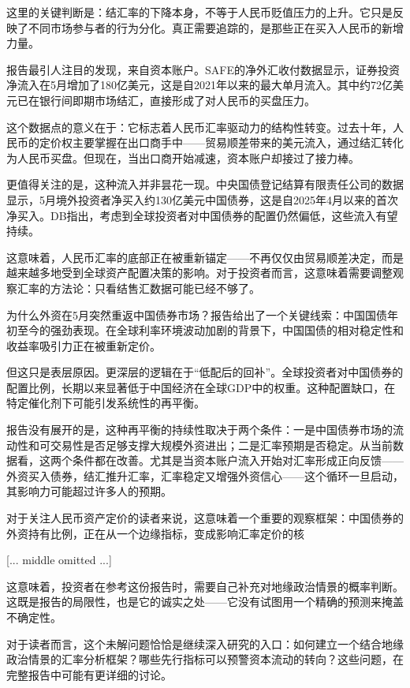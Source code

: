 \documentclass[11pt]{ctexart}
\begin{document}
这里的关键判断是：结汇率的下降本身，不等于人民币贬值压力的上升。它只是反映了不同市场参与者的行为分化。真正需要追踪的，是那些正在买入人民币的新增力量。

报告最引人注目的发现，来自资本账户。SAFE的净外汇收付数据显示，证券投资净流入在5月增加了180亿美元，这是自2021年以来的最大单月流入。其中约72亿美元已在银行间即期市场结汇，直接形成了对人民币的买盘压力。

这个数据点的意义在于：它标志着人民币汇率驱动力的结构性转变。过去十年，人民币的定价权主要掌握在出口商手中——贸易顺差带来的美元流入，通过结汇转化为人民币买盘。但现在，当出口商开始减速，资本账户却接过了接力棒。

更值得关注的是，这种流入并非昙花一现。中央国债登记结算有限责任公司的数据显示，5月境外投资者净买入约130亿美元中国债券，这是自2025年4月以来的首次净买入。DB指出，考虑到全球投资者对中国债券的配置仍然偏低，这些流入有望持续。

这意味着，人民币汇率的底部正在被重新锚定——不再仅仅由贸易顺差决定，而是越来越多地受到全球资产配置决策的影响。对于投资者而言，这意味着需要调整观察汇率的方法论：只看结售汇数据可能已经不够了。

为什么外资在5月突然重返中国债券市场？报告给出了一个关键线索：中国国债年初至今的强劲表现。在全球利率环境波动加剧的背景下，中国国债的相对稳定性和收益率吸引力正在被重新定价。

但这只是表层原因。更深层的逻辑在于“低配后的回补”。全球投资者对中国债券的配置比例，长期以来显著低于中国经济在全球GDP中的权重。这种配置缺口，在特定催化剂下可能引发系统性的再平衡。

报告没有展开的是，这种再平衡的持续性取决于两个条件：一是中国债券市场的流动性和可交易性是否足够支撑大规模外资进出；二是汇率预期是否稳定。从当前数据看，这两个条件都在改善。尤其是当资本账户流入开始对汇率形成正向反馈——外资买入债券，结汇推升汇率，汇率稳定又增强外资信心——这个循环一旦启动，其影响力可能超过许多人的预期。

对于关注人民币资产定价的读者来说，这意味着一个重要的观察框架：中国债券的外资持有比例，正在从一个边缘指标，变成影响汇率定价的核

[... middle omitted ...]

这意味着，投资者在参考这份报告时，需要自己补充对地缘政治情景的概率判断。这既是报告的局限性，也是它的诚实之处——它没有试图用一个精确的预测来掩盖不确定性。

对于读者而言，这个未解问题恰恰是继续深入研究的入口：如何建立一个结合地缘政治情景的汇率分析框架？哪些先行指标可以预警资本流动的转向？这些问题，在完整报告中可能有更详细的讨论。
\end{document}
